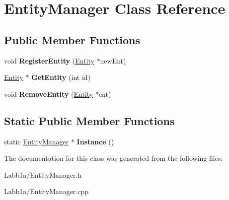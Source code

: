\hypertarget{class_entity_manager}{}\section{Entity\+Manager Class Reference}
\label{class_entity_manager}
\subsection*{Public Member Functions}
\begin{DoxyCompactItemize}
\item 
\hypertarget{class_entity_manager_a5ada06752ff17e52487c40253b9807ac}{}void {\bfseries Register\+Entity} (\hyperlink{class_entity}{Entity} $\ast$new\+Ent)\label{class_entity_manager_a5ada06752ff17e52487c40253b9807ac}

\item 
\hypertarget{class_entity_manager_a62c851c5f750c5d88d761eeb6c3757c2}{}\hyperlink{class_entity}{Entity} $\ast$ {\bfseries Get\+Entity} (int id)\label{class_entity_manager_a62c851c5f750c5d88d761eeb6c3757c2}

\item 
\hypertarget{class_entity_manager_ae0ab17f0fa95c0e46f0bb7b96ae7df71}{}void {\bfseries Remove\+Entity} (\hyperlink{class_entity}{Entity} $\ast$ent)\label{class_entity_manager_ae0ab17f0fa95c0e46f0bb7b96ae7df71}

\end{DoxyCompactItemize}
\subsection*{Static Public Member Functions}
\begin{DoxyCompactItemize}
\item 
\hypertarget{class_entity_manager_a8dd5a07092d1c2220c53dfc524e28ef8}{}static \hyperlink{class_entity_manager}{Entity\+Manager} $\ast$ {\bfseries Instance} ()\label{class_entity_manager_a8dd5a07092d1c2220c53dfc524e28ef8}

\end{DoxyCompactItemize}


The documentation for this class was generated from the following files\+:\begin{DoxyCompactItemize}
\item 
Labb1a/Entity\+Manager.\+h\item 
Labb1a/Entity\+Manager.\+cpp\end{DoxyCompactItemize}
